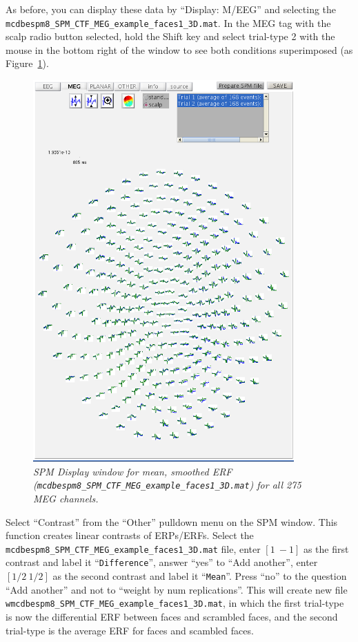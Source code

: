 As before, you can display these data by ``Display: M/EEG'' and selecting the \texttt{mcdbespm8\_\-SPM\_\-CTF\_\-MEG\_\-example\_\-faces1\_3D.mat}. In the MEG tag with the scalp radio button selected, hold the Shift key and select trial-type 2 with the mouse in the bottom right of the window to see both conditions superimposed (as Figure~\ref{multimodal:fig:10}).

\begin{figure}
\begin{center}
\includegraphics[width=100mm]{multimodal/figures/meg_scalp_erf}
\caption{\em SPM Display window for mean, smoothed ERF (\texttt{mcdbespm8\_\-SPM\_\-CTF\_\-MEG\_\-example\_\-faces1\_\-3D.mat}) for all 275 MEG channels. \label{multimodal:fig:10}}
\end{center}
\end{figure}

Select ``Contrast'' from the ``Other'' pulldown menu on the SPM window. This function creates linear contrasts of ERPs/ERFs. Select the \texttt{mcdbespm8\_SPM\_CTF\_MEG\_example\_faces1\_3D.mat} file, enter $[1\: -1]$ as the first contrast and label it ``\texttt{Difference}'', answer ``yes'' to ``Add another'',  enter $[1/2\: 1/2]$ as the second contrast and label it ``\texttt{Mean}''. Press ``no'' to the question ``Add another'' and not to ``weight by num replications''. This will create new file \texttt{wmcdbespm8\_\-SPM\_\-CTF\_\-MEG\_\-example\_\-faces1\_\-3D.mat}, in which the first trial-type is now the differential ERF between faces and scrambled faces, and the second trial-type is the average ERF for faces and scambled faces.

